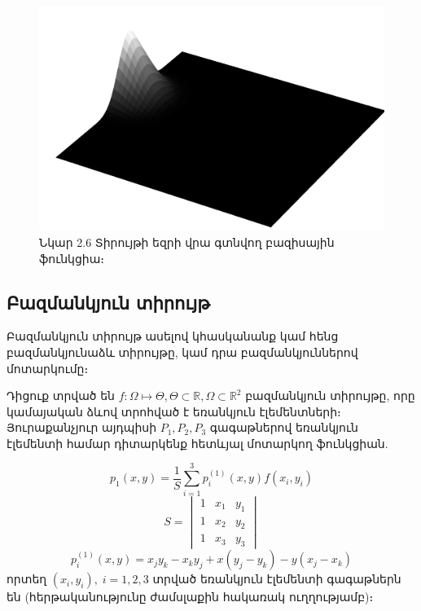\documentclass[fleqn, bachelor,subf,12pt,notitlepage]{article}
\begin{document}
\begin{figure}[h!]
\centering
\includegraphics[width=1.0\textwidth]{images/two_dimensional_basis_1}
\captionsetup{labelformat=empty}
\caption{\hfill Նկար 2.6 Տիրույթի եզրի վրա գտնվող բազիսային ֆունկցիա։}
\end{figure}

\newpage
\subsection*{Բազմանկյուն տիրույթ}

Բազմանկյուն տիրույթ ասելով կհասկանանք կամ հենց բազմանկյունաձև տիրույթը, կամ դրա բազմանկյուններով մոտարկումը։ 

Դիցուք տրված են $f:\Omega\mapsto \Theta, \Theta \subset \mathbb{R}, \Omega \subset \mathbb{R}^{2} $ բազմանկյուն տիրույթը, որը կամայական ձևով տրոհված է եռանկյուն էլեմենտների։ Յուրաքանչյուր այդպիսի $P_{1}, P_{2}, P_{3}$ գագաթներով եռանկյուն էլեմենտի համար դիտարկենք հետևյալ մոտարկող ֆունկցիան.

\begin{equation}
p_{1}(x, y) = \dfrac{1}{S}\sum_{i=1}^{3} p^{(1)}_{i}(x,y)f(x_{i}, y_{i})
\end{equation}
$$S = \begin{vmatrix}
     1 & x_1 & y_1\\ 
     1 & x_2 & y_2\\
     1 & x_3 & y_3 
\end{vmatrix}$$
\begin{equation}
p^{(1)}_{i}(x,y) = x_{j}y_{k}-x_{k}y_{j}+x(y_{j}-y_{k})-y(x_{j}-x_{k})
\end{equation}
\noindent որտեղ $(x_{i}, y_{i}), \; i=1, 2, 3$ տրված եռանկյուն էլեմենտի գագաթներն են (հերթականությունը ժամսլաքին հակառակ ուղղությամբ)։
\end{document}
